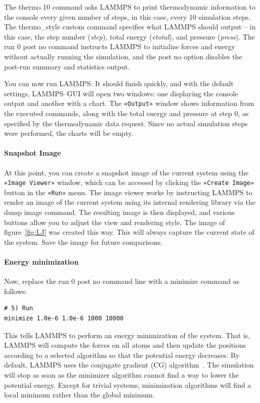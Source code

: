\documentclass[9pt,tutorial]{livecoms}
\newcommand{\lmpcmd}[1]{\hspace{0pt}\colorbox{listing}{\textcolor{command}{\small{#1}}}\hspace{0pt}} %
\newcommand{\guicmd}[1]{\textcolor{command}{\texttt{«#1»}}} %
\begin{document}
The \lmpcmd{thermo 10} command asks LAMMPS to print thermodynamic
information to the console every given number of steps, in this case,
every 10 simulation steps.  The \lmpcmd{thermo\_style custom} command
specifies what LAMMPS should output -- in this case, the step number
(\textit{step}), total energy (\textit{etotal}), and pressure (\textit{press}).
The \lmpcmd{run 0 post no} command instructs LAMMPS to initialize forces and energy
without actually running the simulation, and the \lmpcmd{post no} option disables
the post-run summary and statistics output.

You can now run LAMMPS.  It should finish quickly, and with the default
settings, LAMMPS--GUI will open two windows: one displaying the console
output and another with a chart.  The \guicmd{Output} window shows information from
the executed commands, along with the total energy and pressure at step 0,
as specified by the thermodynamic data request.  Since no actual simulation
steps were performed, the charts will be empty.

\paragraph{Snapshot Image}

At this point, you can create a snapshot image of the
current system using the \guicmd{Image Viewer} window, which can be
accessed by clicking the \guicmd{Create Image} button in the \guicmd{Run} menu.
The image viewer works by instructing LAMMPS to render an image of the current system using
its internal rendering library via the \lmpcmd{dump image} command.  The
resulting image is then displayed, and various buttons allow you to adjust
the view and rendering style.  The image of
figure~\ref{fig:LJ} was created this way.  This will always capture the current
state of the system.  Save the image for future comparisons.

\paragraph{Energy minimization}

Now, replace the \lmpcmd{run 0 post no} command line with a \lmpcmd{minimize}
command as follows:
\begin{lstlisting}
# 5) Run
minimize 1.0e-6 1.0e-6 1000 10000
\end{lstlisting}

This tells LAMMPS to perform an energy minimization of the system.  That
is, LAMMPS will compute the forces on all atoms and then update the
positions according to a selected algorithm so that the potential energy
decreases.  By default, LAMMPS uses the conjugate gradient (CG)
algorithm~\cite{hestenes1952methods}.  The simulation will stop as soon
as the minimizer algorithm cannot find a way to lower the potential
energy.  Except for trivial systems, minimization algorithms will find a
local minimum rather than the global minimum.
\end{document}
